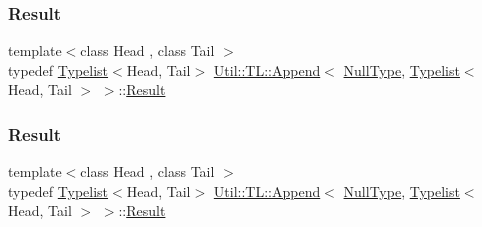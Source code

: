 \subsubsection{\texorpdfstring{Result}{Result}\hspace{0.1cm}{\footnotesize\ttfamily [1/3]}}
{\footnotesize\ttfamily template$<$class Head , class Tail $>$ \\
typedef \mbox{\hyperlink{structUtil_1_1Typelist}{Typelist}}$<$Head, Tail$>$ \mbox{\hyperlink{structUtil_1_1TL_1_1Append}{Util\+::\+T\+L\+::\+Append}}$<$ \mbox{\hyperlink{classUtil_1_1NullType}{Null\+Type}}, \mbox{\hyperlink{structUtil_1_1Typelist}{Typelist}}$<$ Head, Tail $>$ $>$\+::\mbox{\hyperlink{structUtil_1_1TL_1_1Append_3_01NullType_00_01Typelist_3_01Head_00_01Tail_01_4_01_4_aa4d82c7dd5a87a41fa2e1a0046427d13}{Result}}}

\mbox{\label{structUtil_1_1TL_1_1Append_3_01NullType_00_01Typelist_3_01Head_00_01Tail_01_4_01_4_aa4d82c7dd5a87a41fa2e1a0046427d13}} 
\subsubsection{\texorpdfstring{Result}{Result}\hspace{0.1cm}{\footnotesize\ttfamily [2/3]}}
{\footnotesize\ttfamily template$<$class Head , class Tail $>$ \\
typedef \mbox{\hyperlink{structUtil_1_1Typelist}{Typelist}}$<$Head, Tail$>$ \mbox{\hyperlink{structUtil_1_1TL_1_1Append}{Util\+::\+T\+L\+::\+Append}}$<$ \mbox{\hyperlink{classUtil_1_1NullType}{Null\+Type}}, \mbox{\hyperlink{structUtil_1_1Typelist}{Typelist}}$<$ Head, Tail $>$ $>$\+::\mbox{\hyperlink{structUtil_1_1TL_1_1Append_3_01NullType_00_01Typelist_3_01Head_00_01Tail_01_4_01_4_aa4d82c7dd5a87a41fa2e1a0046427d13}{Result}}}

\mbox{\label{structUtil_1_1TL_1_1Append_3_01NullType_00_01Typelist_3_01Head_00_01Tail_01_4_01_4_aa4d82c7dd5a87a41fa2e1a0046427d13}} 
